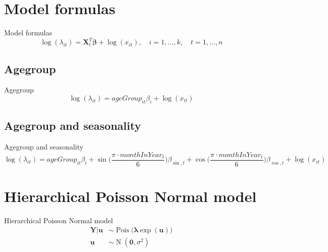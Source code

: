\documentclass[aspectratio=169]{beamer}
\DeclareMathOperator{\N}{N}
\DeclareMathOperator{\Pois}{Pois}
\begin{document}
\hypertarget{model-formulas}{%
\section{Model formulas}\label{model-formulas}}

\begin{frame}{Model formulas}
\begin{equation}
  \log(\lambda_{it})=\boldsymbol{X}_t^T\boldsymbol{\beta}+\log(x_{it}), \quad i=1,\dots,k, \quad t=1,\dots,n
\end{equation}
\end{frame}

\hypertarget{agegroup}{%
\subsection{Agegroup}\label{agegroup}}

\begin{frame}{Agegroup}
\begin{equation}
  \log(\lambda_{it}) = ageGroup_{it} \beta_i + \log(x_{it})
\end{equation}
\end{frame}

\hypertarget{agegroup-and-seasonality}{%
\subsection{Agegroup and seasonality}\label{agegroup-and-seasonality}}

\begin{frame}{Agegroup and seasonality}
\begin{equation}
  \log(\lambda_{it}) = ageGroup_{it} \beta_i + \sin\Big(\frac{\pi\cdot monthInYear_t}{6}\Big) \beta_{\sin,t} + \cos\Big(\frac{\pi \cdot monthInYear_t}{6}\Big) \beta_{\cos,t} + \log(x_{it})
\end{equation}
\end{frame}

\hypertarget{hierarchical-poisson-normal-model}{%
\section{Hierarchical Poisson Normal
model}\label{hierarchical-poisson-normal-model}}

\begin{frame}{Hierarchical Poisson Normal model}
\begin{subequations} \label{eq:PoisN}
  \begin{alignat}{2}
    \boldsymbol{Y|u} &\sim \Pois \big( \boldsymbol{\lambda} \exp(\boldsymbol{u}) \big) \label{eq:pois_n0} \\ 
    \boldsymbol{u} &\sim \N(\boldsymbol{0},\sigma^2) \label{eq:pois_n1}
  \end{alignat}
\end{subequations}
\end{frame}
\end{document}
